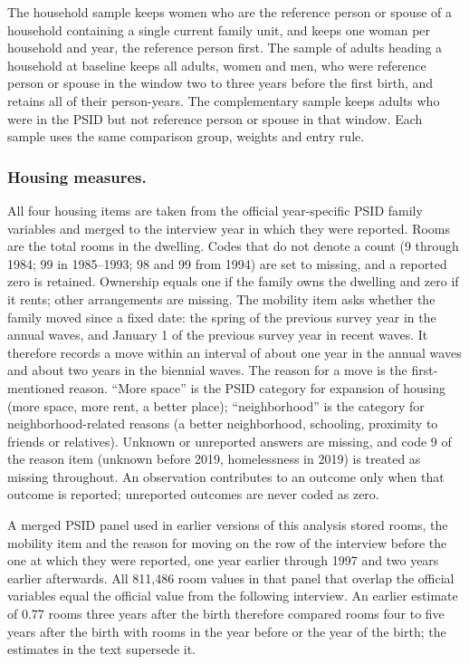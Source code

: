 The household sample keeps women who are the reference person or spouse of a
household containing a single current family unit, and keeps one woman per
household and year, the reference person first. The sample of adults heading a
household at baseline keeps all adults, women and men, who were reference
person or spouse in the window two to three years before the first birth, and
retains all of their person-years. The complementary sample keeps adults who
were in the PSID but not reference person or spouse in that window. Each
sample uses the same comparison group, weights and entry rule.

\subsubsection*{Housing measures.}
All four housing items are taken from the official year-specific PSID family
variables and merged to the interview year in which they were reported. Rooms
are the total rooms in the dwelling. Codes that do not denote a count (9
through 1984; 99 in 1985--1993; 98 and 99 from 1994) are set to missing, and a
reported zero is retained. Ownership equals one if the family owns the
dwelling and zero if it rents; other arrangements are missing. The mobility
item asks whether the family moved since a fixed date: the spring of the
previous survey year in the annual waves, and January 1 of the previous survey
year in recent waves. It therefore records a move within an interval of about
one year in the annual waves and about two years in the biennial waves. The reason for a move is the first-mentioned
reason. ``More space'' is the PSID category for expansion of housing (more
space, more rent, a better place); ``neighborhood'' is the category for
neighborhood-related reasons (a better neighborhood, schooling, proximity to
friends or relatives). Unknown or unreported answers are missing, and code 9
of the reason item (unknown before 2019, homelessness in 2019) is treated as
missing throughout. An observation contributes to an outcome only when that
outcome is reported; unreported outcomes are never coded as zero.

A merged PSID panel used in earlier versions of this analysis stored rooms,
the mobility item and the reason for moving on the row of the interview
before the one at which they were reported, one year earlier through 1997 and
two years earlier afterwards. All 811,486 room values in that panel that
overlap the official variables equal the official value from the following
interview. An earlier estimate of 0.77 rooms three years after the birth
therefore compared rooms four to five years after the birth with rooms in the
year before or the year of the birth; the estimates in the text supersede it.

